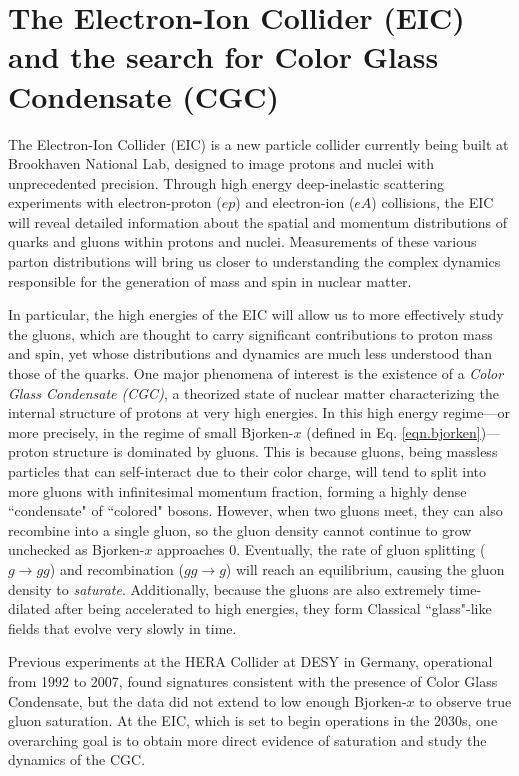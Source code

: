 \section{The Electron-Ion Collider (EIC) and the search for Color Glass Condensate (CGC)}
\label{sec.bkg_EIC}

The Electron-Ion Collider (EIC) \cite{EIC} is a new particle collider currently being built at Brookhaven National Lab, designed to image protons and nuclei with unprecedented precision. Through high energy deep-inelastic scattering experiments with electron-proton ($ep$) and electron-ion ($eA$) collisions, the EIC will reveal detailed information about the spatial and momentum distributions of quarks and gluons within protons and nuclei. Measurements of these various parton distributions will bring us closer to understanding the complex dynamics responsible for the generation of mass and spin in nuclear matter.

In particular, the high energies of the EIC will allow us to more effectively study the gluons, which are thought to carry significant contributions to proton mass and spin, yet whose distributions and dynamics are much less understood than those of the quarks. One major phenomena of interest is the existence of a {\it Color Glass Condensate (CGC)}, a theorized state of nuclear matter characterizing the internal structure of protons at very high energies. In this high energy regime---or more precisely, in the regime of small Bjorken-$x$ (defined in Eq. \eqref{eqn.bjorken})---proton structure is dominated by gluons. This is because gluons, being massless particles that can self-interact due to their color charge, will tend to split into more gluons with infinitesimal momentum fraction, forming a highly dense ``condensate" of ``colored" bosons. However, when two gluons meet, they can also recombine into a single gluon, so the gluon density cannot continue to grow unchecked as Bjorken-$x$ approaches 0. Eventually, the rate of gluon splitting ($g\rightarrow gg$) and recombination ($gg\rightarrow g$) will reach an equilibrium, causing the gluon density to {\it saturate}. Additionally, because the gluons are also extremely time-dilated after being accelerated to high energies, they form Classical ``glass"-like fields that evolve very slowly in time. 

Previous experiments at the HERA Collider at DESY in Germany, operational from 1992 to 2007, found signatures consistent with the presence of Color Glass Condensate, but the data did not extend to low enough Bjorken-$x$ to observe true gluon saturation. At the EIC, which is set to begin operations in the 2030s, one overarching goal is to obtain more direct evidence of saturation and study the dynamics of the CGC.

